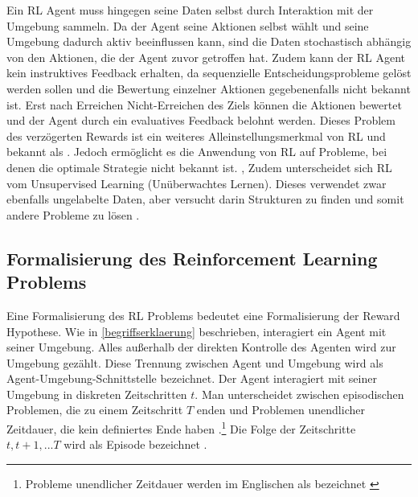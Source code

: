Ein \ac{RL} Agent muss hingegen seine Daten selbst durch Interaktion mit der Umgebung sammeln. 
Da der Agent seine Aktionen selbst wählt und seine Umgebung dadurch aktiv beeinflussen kann, sind die Daten stochastisch abhängig von den Aktionen, die der Agent zuvor getroffen hat. \cite[S. 16]{kontesg.SeminarReinforcementLearning2021} 
Zudem kann der \ac{RL} Agent kein instruktives Feedback erhalten, da sequenzielle Entscheidungsprobleme gelöst werden sollen und die Bewertung einzelner Aktionen gegebenenfalls nicht bekannt ist. 
Erst nach Erreichen \bzw Nicht-Erreichen des Ziels können die Aktionen bewertet und der Agent durch ein evaluatives Feedback belohnt werden. \cite[S. 17]{suttonReinforcementLearningIntroduction2018}
Dieses Problem des verzögerten Rewards ist ein weiteres Alleinstellungsmerkmal von \ac{RL} und bekannt als  \cite[S. 17]{suttonReinforcementLearningIntroduction2018}.
Jedoch ermöglicht es die Anwendung von \ac{RL} auf Probleme, bei denen die optimale Strategie nicht bekannt ist. \cite[S. 2]{suttonReinforcementLearningIntroduction2018}, \cite[S. 16]{kontesg.SeminarReinforcementLearning2021}
Zudem unterscheidet sich \ac{RL} vom Unsupervised Learning (\dt Unüberwachtes Lernen).
Dieses verwendet zwar ebenfalls ungelabelte Daten, aber versucht darin Strukturen zu finden und somit andere Probleme zu lösen \cite[2]{suttonReinforcementLearningIntroduction2018}.

\subsection{Formalisierung des Reinforcement Learning Problems}
\label{formalisierung}

Eine Formalisierung des \ac{RL} Problems bedeutet eine Formalisierung der Reward Hypothese. 
Wie in \cref{begriffserklaerung} beschrieben, interagiert ein Agent mit seiner Umgebung. 
Alles außerhalb der direkten Kontrolle des Agenten wird zur Umgebung gezählt. 
Diese Trennung zwischen Agent und Umgebung wird als Agent-Umgebung-Schnittstelle bezeichnet. \cite[S. 47]{suttonReinforcementLearningIntroduction2018} 
Der Agent interagiert mit seiner Umgebung in diskreten Zeitschritten $t$. 
Man unterscheidet zwischen episodischen Problemen, die zu einem Zeitschritt $T$ enden und Problemen unendlicher Zeitdauer, die kein definiertes Ende haben \cite[S. 11]{suttonReinforcementLearningIntroduction2018}.\footnote{Probleme unendlicher Zeitdauer werden im Englischen als  bezeichnet \cite[S. 11]{suttonReinforcementLearningIntroduction2018}} 
Die Folge der Zeitschritte $t,t+1,...T$ wird als Episode bezeichnet \cite[S. 54]{suttonReinforcementLearningIntroduction2018}. 

